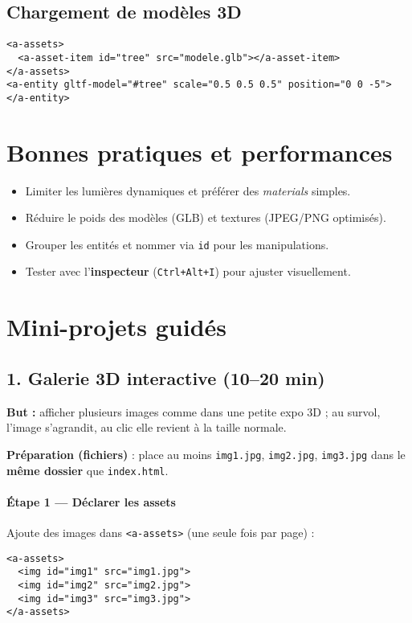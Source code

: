 \documentclass[12pt]{article}
\begin{document}
\subsection{Chargement de modèles 3D}
\begin{verbatim}
<a-assets>
  <a-asset-item id="tree" src="modele.glb"></a-asset-item>
</a-assets>
<a-entity gltf-model="#tree" scale="0.5 0.5 0.5" position="0 0 -5"></a-entity>
\end{verbatim}

\section{Bonnes pratiques et performances}
\begin{itemize}
  \item Limiter les lumières dynamiques et préférer des \textit{materials} simples.
  \item Réduire le poids des modèles (GLB) et textures (JPEG/PNG optimisés).
  \item Grouper les entités et nommer via \texttt{id} pour les manipulations.
  \item Tester avec l'\textbf{inspecteur} (\texttt{Ctrl+Alt+I}) pour ajuster visuellement.
\end{itemize}

\section{Mini-projets guidés}

\subsection*{1. Galerie 3D interactive (10–20 min)}

\textbf{But :} afficher plusieurs images comme dans une petite expo 3D ; au survol, l’image s’agrandit, au clic elle revient à la taille normale.

\textbf{Préparation (fichiers)} : place au moins \texttt{img1.jpg}, \texttt{img2.jpg}, \texttt{img3.jpg} dans le \textbf{même dossier} que \texttt{index.html}.

\paragraph{Étape 1 — Déclarer les assets}
Ajoute des images dans \texttt{<a-assets>} (une seule fois par page) :

\begin{verbatim}
<a-assets>
  <img id="img1" src="img1.jpg">
  <img id="img2" src="img2.jpg">
  <img id="img3" src="img3.jpg">
</a-assets>
\end{verbatim}
\end{document}

